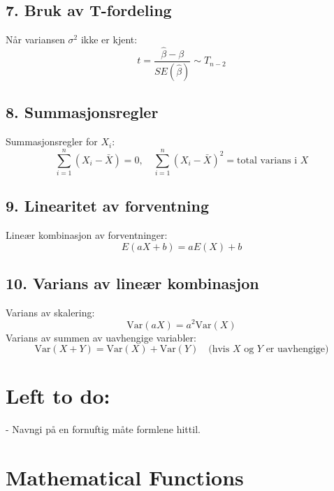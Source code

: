 \documentclass[a4paper,11pt]{article}
\begin{document}
\begin{footnotesize}
\begin{multicols}{2}
\begin{minipage}{\linewidth}
\end{minipage}
\begin{minipage}{\linewidth}

\subsection*{7. Bruk av T-fordeling}
Når variansen \(\sigma^2\) ikke er kjent:
\[
t = \frac{\hat{\beta} - \beta}{SE(\hat{\beta})} \sim T_{n-2}
\]

\end{minipage}
\begin{minipage}{\linewidth}

\subsection*{8. Summasjonsregler}
Summasjonsregler for \(X_i\):
\[
\sum_{i=1}^n (X_i - \bar{X}) = 0, \quad \sum_{i=1}^n (X_i - \bar{X})^2 = \text{total varians i } X
\]

\end{minipage}
\begin{minipage}{\linewidth}

\subsection*{9. Linearitet av forventning}
Lineær kombinasjon av forventninger:
\[
E(aX + b) = aE(X) + b
\]

\subsection*{10. Varians av lineær kombinasjon}
Varians av skalering:
\[
\text{Var}(aX) = a^2\text{Var}(X)
\]
Varians av summen av uavhengige variabler:
\[
\text{Var}(X + Y) = \text{Var}(X) + \text{Var}(Y) \quad \text{(hvis \(X\) og \(Y\) er uavhengige)}
\]





\section*{Left to do:}
- Navngi på en fornuftig måte formlene hittil.

\section*{Mathematical Functions}


\end{minipage}
\end{multicols}
\end{footnotesize}
\end{document}
